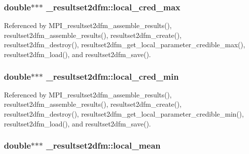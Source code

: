\subsubsection[{\texorpdfstring{local\+\_\+cred\+\_\+max}{local_cred_max}}]{\setlength{\rightskip}{0pt plus 5cm}double$\ast$$\ast$$\ast$ \+\_\+resultset2dfm\+::local\+\_\+cred\+\_\+max}\hypertarget{struct__resultset2dfm_a0967da81d5d8c436260604450a614902}{}\label{struct__resultset2dfm_a0967da81d5d8c436260604450a614902}


Referenced by M\+P\+I\+\_\+resultset2dfm\+\_\+assemble\+\_\+results(), resultset2dfm\+\_\+assemble\+\_\+results(), resultset2dfm\+\_\+create(), resultset2dfm\+\_\+destroy(), resultset2dfm\+\_\+get\+\_\+local\+\_\+parameter\+\_\+credible\+\_\+max(), resultset2dfm\+\_\+load(), and resultset2dfm\+\_\+save().

\subsubsection[{\texorpdfstring{local\+\_\+cred\+\_\+min}{local_cred_min}}]{\setlength{\rightskip}{0pt plus 5cm}double$\ast$$\ast$$\ast$ \+\_\+resultset2dfm\+::local\+\_\+cred\+\_\+min}\hypertarget{struct__resultset2dfm_a6c926d3a6cd5ad78cf9d2250439f063f}{}\label{struct__resultset2dfm_a6c926d3a6cd5ad78cf9d2250439f063f}


Referenced by M\+P\+I\+\_\+resultset2dfm\+\_\+assemble\+\_\+results(), resultset2dfm\+\_\+assemble\+\_\+results(), resultset2dfm\+\_\+create(), resultset2dfm\+\_\+destroy(), resultset2dfm\+\_\+get\+\_\+local\+\_\+parameter\+\_\+credible\+\_\+min(), resultset2dfm\+\_\+load(), and resultset2dfm\+\_\+save().

\subsubsection[{\texorpdfstring{local\+\_\+mean}{local_mean}}]{\setlength{\rightskip}{0pt plus 5cm}double$\ast$$\ast$$\ast$ \+\_\+resultset2dfm\+::local\+\_\+mean}\hypertarget{struct__resultset2dfm_ad3299fe0e2648f632471f961608af8ad}{}\label{struct__resultset2dfm_ad3299fe0e2648f632471f961608af8ad}


